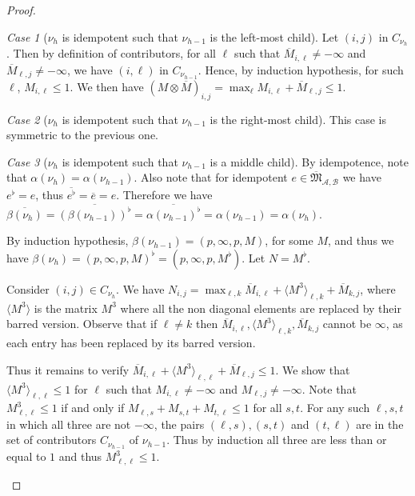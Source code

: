 \documentclass[10pt,a4paper]{amsart}
\theoremstyle{definition}
\numberwithin{equation}{section}
\theoremstyle{remark}
\newtheorem{case}{Case}
\newcommand{\ideal}{\mathfrak{M}}
\newcommand{\autA}{\mathcal{A}}
\newcommand{\autB}{\mathcal{B}}
\theoremstyle{remark}
\begin{document}
\begin{proof}
\begin{case}[$\nu_h$ is idempotent such that $\nu_{h-1}$ is the left-most child]
Let $(i,j)$ in $C_{\nu_h}$. Then by definition of contributors, for all $\ell$ such that $\overline{M}_{i,\ell} \neq -\infty$ and $\overline{M}_{\ell,j} \neq -\infty$, we have $(i,\ell)$ in $C_{\nu_{h-1}}$.  Hence, by induction hypothesis, for such $\ell$, $M_{i,\ell} \leq 1$. We then have $(M\otimes \overline{M})_{i,j} = \max_{\ell} M_{i,\ell} + \overline{M}_{\ell,j} \leq 1$.
\end{case}

\begin{case}[$\nu_h$ is idempotent such that $\nu_{h-1}$ is the right-most child]
This case is symmetric to the previous one.
\end{case}

\begin{case}[$\nu_h$ is idempotent such that $\nu_{h-1}$ is a middle child]
By idempotence, note that $\alpha(\nu_h) = \alpha(\nu_{h-1})$. Also note that for idempotent $e\in \overline{\ideal}_{\autA,\autB}$ we have $e^\flat = e$, thus $\overline{e^\flat} = \overline{e} = e$. Therefore we have $\overline{\beta(\nu_{h})} = \overline{(\beta(\nu_{h-1}))^\flat} = \overline{\alpha(\nu_{h-1})^\flat} = \alpha(\nu_{h-1}) =  \alpha(\nu_h)$.

By induction hypothesis, $\beta(\nu_{h-1}) = (p,\infty,p,M)$,  for some $M$, and thus we have $\beta(\nu_{h})= (p,\infty,p,M)^\flat  = (p,\infty,p,M^\flat)$. Let $N = M^\flat$.

Consider $(i,j)\in C_{\nu_h}$.
We have $N_{i,j} = \max_{\ell,k} \overline{M}_{i,\ell} + \langle M^3 \rangle_{\ell,k} + \overline{M}_{k,j}$, where $\langle M^3 \rangle$ is the matrix $M^3$ where all the non diagonal elements are replaced by their barred version.
Observe that if $\ell \ne k$ then $\overline{M}_{i,\ell},\langle M^3 \rangle_{\ell,k}, \overline{M}_{k,j}$ cannot be $\infty$, as each entry has been replaced by its barred version. 

Thus it remains to verify $\overline{M}_{i,\ell} + \langle M^3 \rangle_{\ell,\ell} + \overline{M}_{\ell,j} \le 1$. We show that $\langle M^3 \rangle_{\ell,\ell}\le 1$ for $\ell$ such that $M_{i,\ell} \ne -\infty$ and $M_{\ell,j} \ne-\infty$. Note that $M^3_{\ell,\ell} \le 1$ if and only if $M_{\ell,s} + M_{s,t} + M_{t,\ell}\le 1$ for all $s,t$. For any such $\ell,s,t$ in which all three are not $-\infty$, the pairs $(\ell,s),(s,t)$ and $(t,\ell)$ are in the set of contributors $C_{\nu_{h-1}}$ of $\nu_{h-1}$. Thus by induction all three are less than or equal to $1$ and thus $M^3_{\ell,\ell} \le 1$.
\qedhere
\end{case}
\end{proof}
\end{document}
